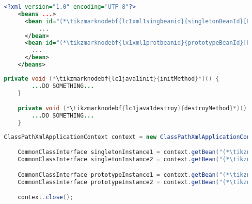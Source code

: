 \example
\begin{lstlisting}[language=XML, title={Configuration XML}]
    <?xml version="1.0" encoding="UTF-8"?>
    <beans ...>
      <bean id="(*\tikzmarknodebf{lc1xml1singbeanid}{singletonBeanId}[ForestGreen]*)" class="package.subfolder.CommonClass" init-method="(*\tikzmarknodebf{lc1xml1singinit}{initMethod}[ForestGreen]*)" destroy-method="(*\tikzmarknodebf{lc1xml1singdestroy}{destroyMethod}[ForestGreen]*)">
          ...
      </bean>
      <bean id="(*\tikzmarknodebf{lx1xml1protbeanid}{prototypeBeanId}[ForestGreen]*)" class="package.subfolder.CommonClass" scope="prototype" init-method="(*\tikzmarknodebf{lc1xml1protinit}{initMethod}[ForestGreen]*)" destroy-method="(*\tikzmarknodebf{lc1xml1protdestroy}{destroyMethod}[ForestGreen]*)">
        ...
      </bean>
    </beans>
\end{lstlisting}
\begin{lstlisting}[language=Java, title={Common class for singleton and prototype beans}]
    private void (*\tikzmarknodebf{lc1java1init}{initMethod}*)() {
        ...DO SOMETHING...
    }

    private void (*\tikzmarknodebf{lc1java1destroy}{destroyMethod}*)() {
        ...DO SOMETHING...
    }
\end{lstlisting}
\begin{lstlisting}[language=Java, title={Usage}]
    ClassPathXmlApplicationContext context = new ClassPathXmlApplicationContext("configurationFile.xml");

    CommonClassInterface singletonInstance1 = context.getBean("(*\tikzmarknodebf{lc1java1singbeanid1}{singletonBeanId}[ForestGreen]*)", CommonClassInterface.class);
    CommonClassInterface singletonInstance2 = context.getBean("(*\tikzmarknodebf{lc1java1singbeanid2}{singletonBeanId}[ForestGreen]*)", CommonClassInterface.class);

    CommonClassInterface prototypeInstance1 = context.getBean("(*\tikzmarknodebf{lc1java1protbeanid1}{prototypeBeanId}[ForestGreen]*)", CommonClassInterface.class);
    CommonClassInterface prototypeInstance2 = context.getBean("(*\tikzmarknodebf{lc1java1protbeanid2}{prototypeBeanId}[ForestGreen]*)", CommonClassInterface.class);

    context.close();
\end{lstlisting}

